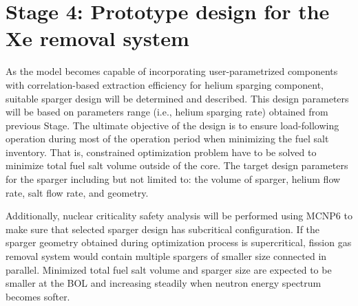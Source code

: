 \section{Stage 4: Prototype design for the Xe removal system}
As the model becomes capable of incorporating user-parametrized components 
with correlation-based extraction efficiency for helium sparging component, 
suitable sparger design will be determined and described. This design 
parameters will be based on parameters range (i.e., helium sparging rate) 
obtained from previous Stage. The ultimate objective of the design is to 
ensure load-following operation during most of the operation period when 
minimizing the fuel salt inventory. That is, constrained optimization problem 
have to be solved to minimize total fuel salt volume outside of the core. The 
target design parameters for the sparger including but not limited to: the 
volume of sparger, helium flow rate, salt flow rate, and geometry.

Additionally, nuclear criticality safety analysis will be performed using 
MCNP6 \cite{werner_mcnp6._2018} to make sure that selected sparger design has  
subcritical configuration. If the sparger geometry obtained during 
optimization process is supercritical, fission gas removal system would 
contain multiple spargers of smaller size connected in parallel. Minimized 
total fuel salt volume and sparger size are expected to be smaller at the 
\gls{BOL} and increasing steadily when neutron energy spectrum becomes softer.

